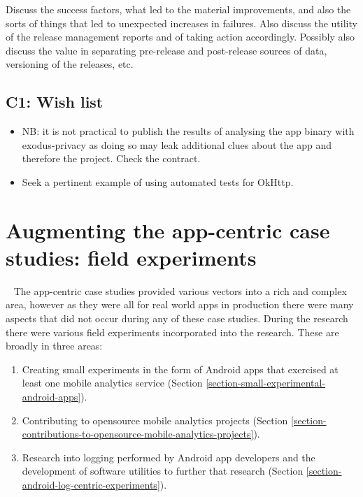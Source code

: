 Discuss the success factors, what led to the material improvements, and also the sorts of things that led to unexpected increases in failures. Also discuss the utility of the release management reports and of taking action accordingly. Possibly also discuss the value in separating pre-release and post-release sources of data, versioning of the releases, etc.

\subsection*{C1: Wish list}
{\small

\begin{itemize}
    \item NB: it is not practical to publish the results of analysing the app binary with exodus-privacy as doing so may leak additional clues about the app and therefore the project. Check the contract.
    \item Seek a pertinent example of using automated tests for OkHttp.
\end{itemize}
}

\clearpage


\section{Augmenting the app-centric case studies: field experiments}~\label{section-field-experiments-to-augment-app-centric-case-studies}
The app-centric case studies provided various vectors into a rich and complex area, however as they were all for real world apps in production there were many aspects that did not occur during any of these case studies. During the research there were various field experiments incorporated into the research. These are broadly in three areas:

\begin{enumerate}
    \itemsep0em
    \item Creating small experiments in the form of Android apps that exercised at least one mobile analytics service (Section \ref{section-small-experimental-android-apps}).
    \item Contributing to opensource mobile analytics projects (Section \ref{section-contributions-to-opensource-mobile-analytics-projects}).
    \item Research into logging performed by Android app developers and the development of software utilities to further that research (Section \ref{section-android-log-centric-experiments}). 
\end{enumerate}

